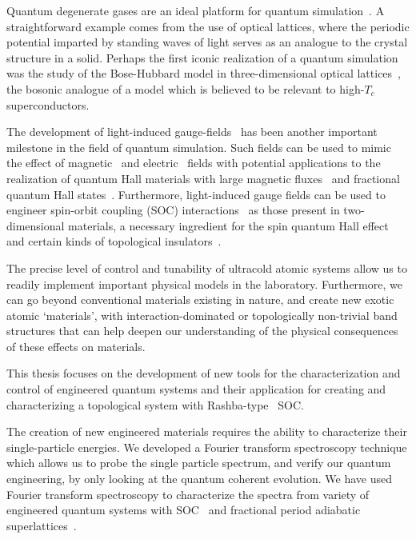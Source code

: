 Quantum degenerate gases are an ideal platform for quantum simulation~\cite{bloch_quantum_2012}. A straightforward example comes from the use of optical lattices, where the periodic potential imparted by standing waves of light serves as an analogue to the crystal structure in a solid. Perhaps the first iconic realization of a quantum simulation was the study of the Bose-Hubbard model in three-dimensional optical lattices~\cite{greiner_quantum_2002}, the bosonic analogue of a model which is believed to be relevant to high-$T_c$ superconductors. 

The development of light-induced gauge-fields~\cite{goldman_light-induced_2014} has been another important milestone in the field of quantum simulation. Such fields can be used to mimic the effect of magnetic~\cite{synthetic_dimensions_theory,lin_synthetic_2009} and electric~\cite{lin_synthetic_2011} fields with potential applications to the realization of quantum Hall materials with large magnetic fluxes~\cite{synthetic_dimensions_theory,miyake_realizing_2013} and fractional quantum Hall states~\cite{cooper_reaching_2013}. Furthermore, light-induced gauge fields can be used to engineer spin-orbit coupling (SOC) interactions~\cite{galitski_spin-orbit_2013} as those present in two-dimensional materials, a necessary ingredient for the spin quantum Hall effect and certain kinds of topological insulators~\cite{hasan_colloquium:_2010}.%

The precise level of control and tunability of ultracold atomic systems allow us to readily implement important physical models in the laboratory. Furthermore, we can go beyond conventional materials existing in nature, and create new exotic atomic `materials', with interaction-dominated or topologically non-trivial band structures that can help deepen our understanding of the physical consequences of these effects on materials.

This thesis focuses on the development of new tools for the characterization and control of engineered quantum systems and their application for creating and characterizing a topological system with Rashba-type~\cite{bychkov_oscillatory_1984} SOC. 

The creation of new engineered materials requires the ability to characterize their single-particle energies. We developed a Fourier transform spectroscopy technique which allows us to probe the single particle spectrum, and verify our quantum engineering, by only looking at the quantum coherent evolution. We have used Fourier transform spectroscopy to characterize the spectra from variety of engineered quantum systems with SOC~\cite{valdes-curiel_fourier_2017,valdes-curiel_unconventional_2019} and fractional period adiabatic superlattices~\cite{anderson_realization_2019}.

